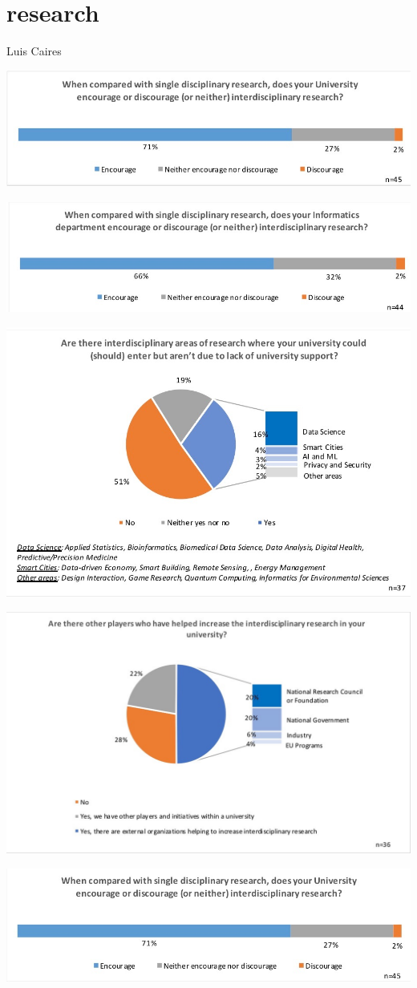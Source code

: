 \section{research}

Luis Caires

\includegraphics[width = \linewidth]{charts/1a.jpg}

\includegraphics[width = \linewidth]{charts/1b.jpg}

\includegraphics[width = \linewidth]{charts/1c.jpg}

\includegraphics[width = \linewidth]{charts/1d.jpg}

\includegraphics[width = \linewidth]{charts/1e.jpg}


